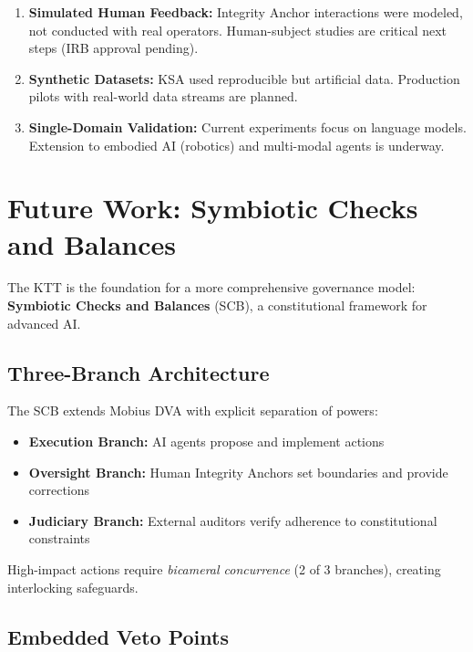\documentclass[11pt,letterpaper]{article}
\begin{document}
\begin{enumerate}
    \item \textbf{Simulated Human Feedback:} Integrity Anchor interactions were modeled, not conducted with real operators. Human-subject studies are critical next steps (IRB approval pending).
    
    \item \textbf{Synthetic Datasets:} KSA used reproducible but artificial data. Production pilots with real-world data streams are planned.
    
    \item \textbf{Single-Domain Validation:} Current experiments focus on language models. Extension to embodied AI (robotics) and multi-modal agents is underway.
\end{enumerate}

\section{Future Work: Symbiotic Checks and Balances}
\label{sec:future}

The KTT is the foundation for a more comprehensive governance model: \textbf{Symbiotic Checks and Balances} (SCB), a constitutional framework for advanced AI.

\subsection{Three-Branch Architecture}

The SCB extends Mobius DVA with explicit separation of powers:

\begin{itemize}
    \item \textbf{Execution Branch:} AI agents propose and implement actions
    \item \textbf{Oversight Branch:} Human Integrity Anchors set boundaries and provide corrections
    \item \textbf{Judiciary Branch:} External auditors verify adherence to constitutional constraints
\end{itemize}

High-impact actions require \textit{bicameral concurrence} (2 of 3 branches), creating interlocking safeguards.

\subsection{Embedded Veto Points}
\end{document}
